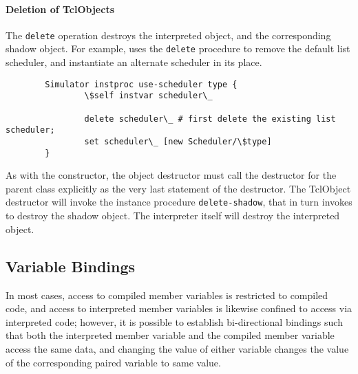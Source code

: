\paragraph{Deletion of TclObjects}
The {\tt delete} operation
destroys the interpreted object, and the corresponding shadow object.
For example,
uses the {\tt delete} procedure to remove the default list scheduler,
and instantiate an alternate scheduler in its place.
\begin{verbatim}
        Simulator instproc use-scheduler type {
                \$self instvar scheduler\_

                delete scheduler\_ # first delete the existing list scheduler;
                set scheduler\_ [new Scheduler/\$type]
        }
\end{verbatim}

As with the constructor, the object destructor must call the destructor
for the parent class explicitly as the very last statement of the destructor.
The TclObject destructor
will invoke the instance procedure {\tt delete-shadow},
that in turn invokes 
to destroy the shadow object.
The interpreter itself will destroy the interpreted object.

\subsection{Variable Bindings}
\label{sec:VarBinds}

In most cases,
access to compiled member variables is restricted to compiled code,
and access to interpreted member variables is likewise
confined to access via interpreted code;
however, it is possible to establish bi-directional bindings
such that both the interpreted member variable
and the compiled member variable access the same data, 
and changing the value of either variable
changes the value of the corresponding paired variable to same value.

